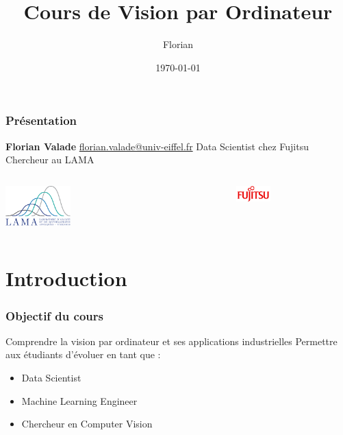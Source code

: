 \documentclass{beamer}
\title{Cours de Vision par Ordinateur}
\author{Florian}
\date{\today}
\begin{document}
\begin{frame}
    \titlepage
\end{frame}

\begin{frame}
    \frametitle{Présentation}
    \textbf{Florian Valade} \newline
    \href{mailto:florian.valade@univ-eiffel.fr}{florian.valade@univ-eiffel.fr} \newline
    Data Scientist chez Fujitsu \newline
    Chercheur au LAMA \newline
    \begin{columns}
        \begin{column}{0.5\textwidth}
            \begin{flushleft}
                \includegraphics[width=0.3\textwidth]{images/lama.png}
            \end{flushleft}
        \end{column}
        \begin{column}{0.5\textwidth}
            \begin{flushright}
                \includegraphics[width=0.3\textwidth]{images/fujitsu.png}
            \end{flushright}
        \end{column}
    \end{columns}
\end{frame}

\section{Introduction}

\begin{frame}
    \frametitle{Objectif du cours}
    Comprendre la vision par ordinateur et ses applications industrielles \newline
    Permettre aux étudiants d'évoluer en tant que :
    \begin{itemize}
        \item Data Scientist
        \item Machine Learning Engineer
        \item Chercheur en Computer Vision
    \end{itemize}
\end{frame}
\end{document}
